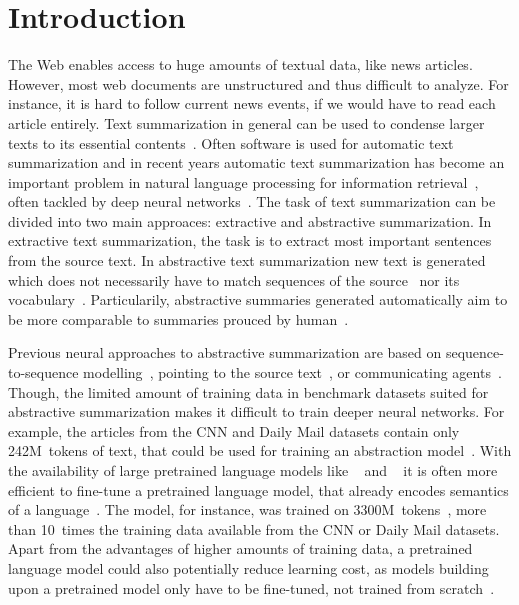 \section{Introduction} %

The Web enables access to huge amounts of textual data, like news articles.
However, most web documents are unstructured and thus difficult to analyze.
For instance, it is hard to follow current news events, if we would have to read each article entirely.
Text summarization in general can be used to condense larger texts to its essential contents~\cite[xix]{Torres-Moreno2014}.
Often software is used for automatic text summarization and in recent years
automatic text summarization has become an important problem in natural language processing for information retrieval~\cite[xxi]{Torres-Moreno2014}, often tackled by deep neural networks~\cite{CelikyilmazBHC2018,LiuL2019,NallapatiZSGX2016,PaulusXS2018,SeeLM2017}.
The task of text summarization can be divided into two main approaces: extractive and abstractive summarization. In extractive text summarization, the task is to extract most important sentences from the source text. In abstractive text summarization new text is generated which does not necessarily have to match sequences of the source~\cite[28]{Torres-Moreno2014} nor its vocabulary~\cite{NallapatiZSGX2016}.
Particularily, abstractive summaries generated automatically aim to be more comparable to summaries prouced by human~\cite[220]{Torres-Moreno2014}.

Previous neural approaches to abstractive summarization are based on sequence-to-sequence modelling~\cite{NallapatiZSGX2016}, pointing to the source text~\cite{SeeLM2017}, or communicating agents~\cite{CelikyilmazBHC2018}.
Though, the limited amount of training data in benchmark datasets suited for abstractive summarization makes it difficult to train deeper neural networks.
For example, the articles from the CNN and Daily Mail datasets contain only 242M~tokens of text, that could be used for training an abstraction model~\cite{HermannKGEKSB2015}.
With the availability of large pretrained language models like \Elmo~\cite{PetersNIGCLZ2018} and \Bert~\cite{DevlinCLT2019} it is often more efficient to fine-tune a pretrained language model, that already encodes semantics of a language~\cite{LiuL2019}.
The \Bert model, for instance, was trained on 3300M~tokens~\cite{DevlinCLT2019}, more than 10~times the training data available from the CNN or Daily Mail datasets.
Apart from the advantages of higher amounts of training data, a pretrained language model could also potentially reduce learning cost, as models building upon a pretrained model only have to be fine-tuned, not trained from scratch~\cite{DevlinCLT2019}.


